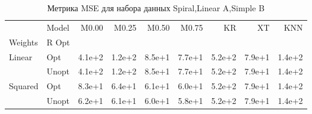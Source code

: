 \begin{table}
\caption{Метрика MSE для набора данных Spiral,Linear A,Simple B}
\label{tab:MSE_Spiral,Linear A,Simple B}
\begin{tabular}{llrrrrrrr}
\toprule
 & Model & M0.00 & M0.25 & M0.50 & M0.75 & KR & XT & KNN \\
Weights & R Opt &  &  &  &  &  &  &  \\
\midrule
\multirow[t]{2}{*}{Linear} & Opt & 4.1e+2 & 1.2e+2 & 8.5e+1 & 7.7e+1 & 5.2e+2 & 7.9e+1 & 1.4e+2 \\
 & Unopt & 4.1e+2 & 1.2e+2 & 8.5e+1 & 7.7e+1 & 5.2e+2 & 7.9e+1 & 1.4e+2 \\

\multirow[t]{2}{*}{Squared} & Opt & 8.3e+1 & 6.4e+1 & 6.1e+1 & 6.0e+1 & 5.2e+2 & 7.9e+1 & 1.4e+2 \\
 & Unopt & 6.2e+1 & 6.1e+1 & 6.0e+1 & 5.8e+1 & 5.2e+2 & 7.9e+1 & 1.4e+2 \\

\bottomrule
\end{tabular}
\end{table}
